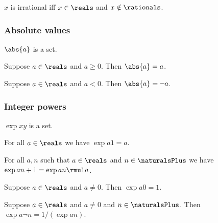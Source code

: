 \begin{abbreviation}\label{real_irrational}
    $x$ is irrational iff $x\in\reals$ and $x\notin\rationals$.
\end{abbreviation}

\subsubsection{Absolute values}

\begin{signature} \label{sig8}
    $\abs{a}$ is a set.
\end{signature}

\begin{axiom}\label{real_abs_nonneg}
    Suppose $a\in\reals$ and $a \geq 0$.
    Then $\abs{a} = a$.
\end{axiom}

\begin{axiom}\label{real_abs_neg}
    Suppose $a\in\reals$ and $a < 0$.
    Then $\abs{a} = \neg{a}$.
\end{axiom}

\subsubsection{Integer powers}

\begin{signature} \label{sig7}
    $\exp{x}{y}$ is a set.
\end{signature}

\begin{axiom}\label{real_pow_one}
    For all $a\in\reals$ we have $\exp{a}{1} = a$.
\end{axiom}

\begin{axiom}\label{real_pow_succ}
    For all $a, n$ such that $a\in\reals$ and $n\in\naturalsPlus$ we have $\exp{a}{n+1} = \exp{a}{n} \rmul a$.
\end{axiom}

\begin{axiom}\label{real_pow_zero}
    Suppose $a\in\reals$ and $a\neq 0$.
    Then $\exp{a}{0} = 1$.
\end{axiom}

\begin{axiom}\label{real_pow_neg}
    Suppose $a\in\reals$ and $a\neq 0$ and $n\in\naturalsPlus$.
    Then $\exp{a}{\neg{n}} = 1 / (\exp{a}{n})$. 
\end{axiom}

